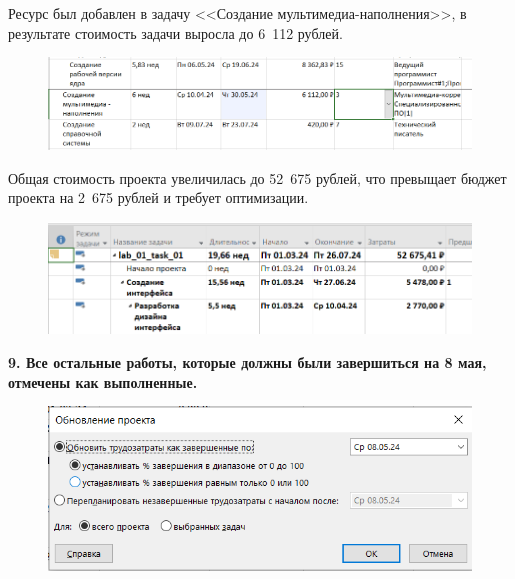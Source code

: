 Ресурс был добавлен в задачу <<Создание мультимедиа-наполнения>>, в результате стоимость задачи выросла до 6~112 рублей.

\begin{figure}[h!]
	\begin{center}
		\includegraphics[scale=0.6]{inc/img/p_23.png}
	\end{center}
	\captionsetup{justification=centering}
	\label{fig:u3}
\end{figure}

Общая стоимость проекта увеличилась до 52~675 рублей, что превыщает бюджет проекта на 2~675 рублей и требует оптимизации.

\begin{figure}[h!]
	\begin{center}
		\includegraphics[scale=0.6]{inc/img/p_24.png}
	\end{center}
	\captionsetup{justification=centering}
	\label{fig:u3}
\end{figure}

\textbf{9. Все остальные работы, которые должны были завершиться на 8 мая,
отмечены как выполненные.}

\begin{figure}[h!]
	\begin{center}
		\includegraphics[scale=0.6]{inc/img/p_25.png}
	\end{center}
	\captionsetup{justification=centering}
	\label{fig:u3}
\end{figure}

